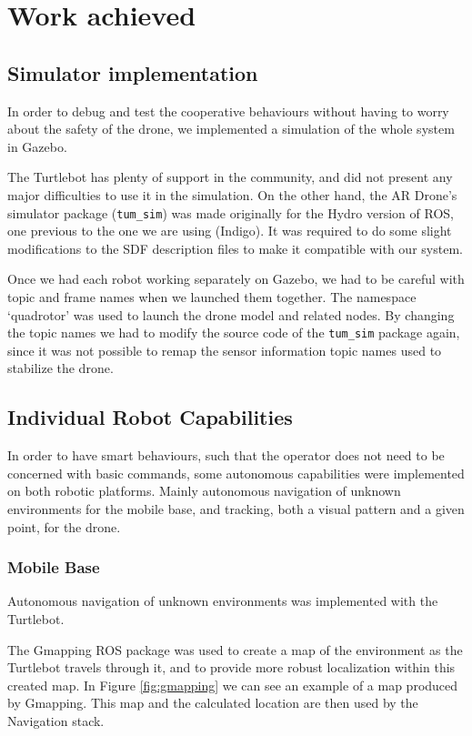 \documentclass[11pt,a4paper]{article}
\begin{document}
\section{Work achieved}

\subsection{Simulator implementation}
In order to debug and test the cooperative behaviours without having to worry about the safety of the drone, we implemented a simulation of the whole system in Gazebo.

The Turtlebot has plenty of support in the community, and did not present any major difficulties to use it in the simulation. On the other hand, the AR Drone's simulator package (\verb!tum_sim!) was made originally for the Hydro version of ROS, one previous to the one we are using (Indigo). It was required to do some slight modifications to the SDF description files to make it compatible with our system.

Once we had each robot working separately on Gazebo, we had to be careful with topic and frame names when we launched them together. The namespace `quadrotor' was used to launch the drone model and related nodes. By changing the topic names we had to modify the source code of the \verb!tum_sim! package again, since it was not possible to remap the sensor information topic names used to stabilize the drone.

\subsection{Individual Robot Capabilities}
In order to have smart behaviours, such that the operator does not need to be concerned with basic commands, some autonomous capabilities were implemented on both robotic platforms. Mainly autonomous navigation of unknown environments for the mobile base, and tracking, both a visual pattern and a given point, for the drone.

\subsubsection{Mobile Base}
Autonomous navigation of unknown environments was implemented with the Turtlebot.

The Gmapping ROS package was used to create a map of the environment as the Turtlebot travels through it, and to provide more robust localization within this created map. In Figure \ref{fig:gmapping} we can see an example of a map produced by Gmapping. This map and the calculated location are then used by the Navigation stack.
\end{document}
